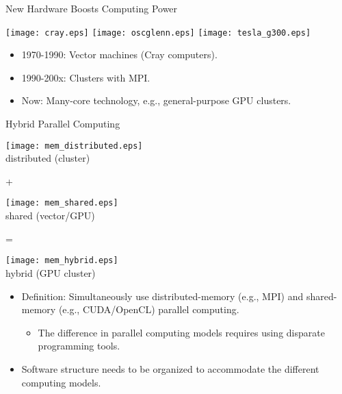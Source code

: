 \documentclass[dvips,xcolor=pst]{beamer}
\begin{document}
\begin{frame}{
%
New Hardware Boosts Computing Power
%
}
\begin{center}
  \texttt{[image: cray.eps]}
  \hspace{0.01\textwidth}
  \texttt{[image: oscglenn.eps]}
  \hspace{0.01\textwidth}
  \texttt{[image: tesla\_g300.eps]}
\end{center}
\begin{itemize}
  \item 1970-1990: Vector machines (Cray computers).
  \item 1990-200x: Clusters with MPI.
  \item Now: Many-core technology, e.g., general-purpose GPU clusters.
\end{itemize}
\end{frame}

\begin{frame}{
%
Hybrid Parallel Computing
%
}
\begin{minipage}[c]{\textwidth}\centering
\parbox{0.3\textwidth}{\centering
\texttt{[image: mem\_distributed.eps]} \\ distributed
(cluster)}
+ 
\parbox{0.3\textwidth}{\centering 
\texttt{[image: mem\_shared.eps]} \\ shared (vector/GPU)}
= 
\parbox{0.3\textwidth}{\centering
\texttt{[image: mem\_hybrid.eps]} \\ hybrid (GPU cluster)}
\end{minipage}
\begin{itemize}
  \item Definition: Simultaneously use distributed-memory (e.g., MPI) and
  shared-memory (e.g., CUDA/OpenCL) parallel computing.
  \begin{itemize}
    \item The difference in parallel computing models requires using disparate
    programming tools.
  \end{itemize}
  \item Software structure needs to be organized to accommodate the different
  computing models.
\end{itemize}
\end{frame}
\end{document}
